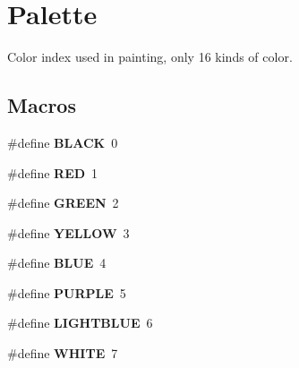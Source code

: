 \hypertarget{group__palette}{}\section{Palette}
\label{group__palette}


Color index used in painting, only 16 kinds of color.  


\subsection*{Macros}
\begin{DoxyCompactItemize}
\item 
\hypertarget{group__palette_ga7b3b25cba33b07c303f3060fe41887f6}{}\#define {\bfseries B\+L\+A\+C\+K}~0\label{group__palette_ga7b3b25cba33b07c303f3060fe41887f6}

\item 
\hypertarget{group__palette_ga8d23feea868a983c8c2b661e1e16972f}{}\#define {\bfseries R\+E\+D}~1\label{group__palette_ga8d23feea868a983c8c2b661e1e16972f}

\item 
\hypertarget{group__palette_gacfbc006ea433ad708fdee3e82996e721}{}\#define {\bfseries G\+R\+E\+E\+N}~2\label{group__palette_gacfbc006ea433ad708fdee3e82996e721}

\item 
\hypertarget{group__palette_gabf681265909adf3d3e8116c93c0ba179}{}\#define {\bfseries Y\+E\+L\+L\+O\+W}~3\label{group__palette_gabf681265909adf3d3e8116c93c0ba179}

\item 
\hypertarget{group__palette_ga79d10e672abb49ad63eeaa8aaef57c38}{}\#define {\bfseries B\+L\+U\+E}~4\label{group__palette_ga79d10e672abb49ad63eeaa8aaef57c38}

\item 
\hypertarget{group__palette_ga0bb0b009e7a7390473ace4d98bd843c0}{}\#define {\bfseries P\+U\+R\+P\+L\+E}~5\label{group__palette_ga0bb0b009e7a7390473ace4d98bd843c0}

\item 
\hypertarget{group__palette_gaaf6e41139cf8cb9ce7824a4f82ff5f83}{}\#define {\bfseries L\+I\+G\+H\+T\+B\+L\+U\+E}~6\label{group__palette_gaaf6e41139cf8cb9ce7824a4f82ff5f83}

\item 
\hypertarget{group__palette_ga87b537f5fa5c109d3c05c13d6b18f382}{}\#define {\bfseries W\+H\+I\+T\+E}~7\label{group__palette_ga87b537f5fa5c109d3c05c13d6b18f382}


\end{DoxyCompactItemize}
